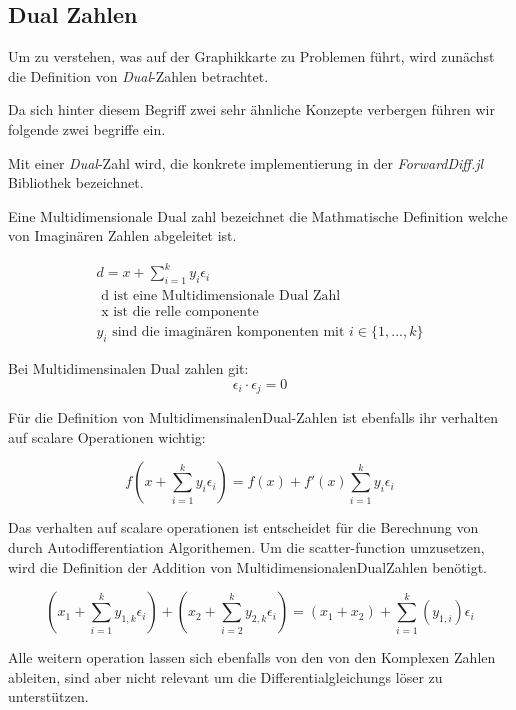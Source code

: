 \subsection{Dual Zahlen}

Um zu verstehen, was auf der Graphikkarte zu Problemen führt, wird zunächst die Definition von \textit{Dual}-Zahlen betrachtet.

Da sich hinter diesem Begriff zwei sehr ähnliche Konzepte verbergen führen wir folgende zwei begriffe ein.

Mit einer \textit{Dual}-Zahl wird, die konkrete implementierung in der \textit{ForwardDiff.jl} Bibliothek bezeichnet.

Eine Multidimensionale Dual zahl bezeichnet die Mathmatische Definition welche von Imaginären Zahlen abgeleitet ist.

\begin{gather*}
 d = x + \sum_{i = 1}^{k} y_i \epsilon_i \\
	\text{ d ist eine Multidimensionale Dual Zahl } \\
	\text{ x ist die relle componente } \\
	y_i \text{ sind die imaginären komponenten mit } i \in \{1, ..., k\}
\end{gather*}

Bei Multidimensinalen Dual zahlen git:
$$
 \epsilon_i \cdot \epsilon_j = 0
$$

Für die Definition von MultidimensinalenDual-Zahlen ist ebenfalls ihr verhalten auf scalare Operationen wichtig:

$$
 f( x + \sum_{i = 1}^{k} y_i \epsilon_i  ) = f(x) +  f'(x) \sum_{i = 1}^{k} y_i \epsilon_i
$$
\cite{juliaForwardDiffPackage}


Das verhalten auf scalare operationen ist entscheidet für die Berechnung von durch Autodifferentiation Algorithemen.
Um die scatter-function umzusetzen, wird die Definition der Addition von MultidimensionalenDualZahlen \cite{RecentAdvances} benötigt.

$$
(x_1 + \sum_{i = 1}^{k} y_{1,k} \epsilon_i) + ( x_2 + \sum_{i = 2}^{k} y_{2,k} \epsilon_i) = (x_1 + x_2) + \sum_{i = 1}^{k} (y_{1, i}) \epsilon_i
$$

Alle weitern operation lassen sich ebenfalls von den von den Komplexen Zahlen ableiten, 
sind aber nicht relevant um die Differentialgleichungs löser zu unterstützen.

